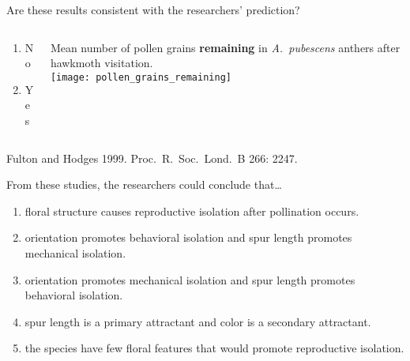 \documentclass[t,handout]{beamer}  %
\newcommand{\ques}[1]{\highlight{\textsc{q#1:}}}
\begin{document}
%
\begin{frame}[t]{\ques{13} Are these results consistent with the researchers' prediction?}
		\begin{columns}[t]
		\begin{column}{0.28\textwidth}
			\begin{enumerate}
				\item No
				\item \alert<2>{Yes}
			\end{enumerate}
		\end{column}
		\begin{column}{0.5\textwidth}
			Mean number of pollen grains \textbf{remaining} in \textit{A.~pubescens} anthers after hawkmoth visitation.\\[1ex]
			\texttt{[image: pollen\_grains\_remaining]}
		\end{column}
	\end{columns}
	
	\vfilll
	
	\tiny Fulton and Hodges 1999. Proc.~R.~Soc.~Lond.~B 266: 2247.
\end{frame}
%
\begin{frame}[t]{\ques{14} From these studies, the researchers could conclude that\dots}
	
	\begin{enumerate}
		\item floral structure causes reproductive isolation after pollination occurs.
		
		\item \alert<2>{orientation promotes behavioral isolation and spur length promotes mechanical isolation.}

		\item orientation promotes mechanical isolation and spur length promotes behavioral isolation.
		
		\item spur length is a primary attractant and color is a secondary attractant.

		\item the species have few floral features that would promote reproductive isolation.
		
	\end{enumerate}

\end{frame}
%
\end{document}
